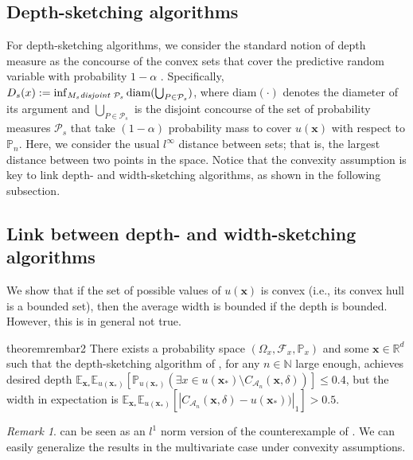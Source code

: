 \documentclass{article} %
\theoremstyle{remark}
\newtheorem{remark}{Remark}[section]
\theoremstyle{definition}      %
\begin{document}
\subsection{Depth-sketching algorithms}
For depth-sketching algorithms, we consider the standard notion of depth measure as the concourse of the convex sets that cover the predictive random variable with probability $1 - \alpha$ \citep[see, e.g.,][]{lei2018distributionfree,barber2021limits,bates2021distributionfree}. Specifically, $D_s(x):= \inf_{M_s \text{\normalfont{\emph{disjoint}} }  \mathcal{P}_s} \mathrm{diam}(\bigcup_{P \in  \mathcal{P}_s})$, where $\mathrm{diam}(\cdot)$ denotes the diameter of its argument and $\bigcup_{P \in  \mathcal{P}_s}$ is the disjoint concourse of the set of probability measures $\mathcal{P}_s$  that take $(1 - \alpha)$ probability mass to cover $u(\bm{x})$ with respect to $\mathbb{P}_n$. Here, we consider the usual $l^{\infty}$ distance between sets; that is, the largest distance between two points in the space. Notice that the convexity assumption is key to link depth- and width-sketching algorithms, as shown in the following subsection. 

\subsection{Link between depth- and width-sketching algorithms}
We show that if the set of possible values of $u(\bm{x})$ is convex (i.e., its convex hull is a bounded set), then the average width is bounded if the depth is bounded. However, this is in general not true.
\begin{restatable}{theorem}{rembar2}\label{prop:rem2}
There exists a probability space $(\Omega_x, \mathcal{F}_x,\mathbb{P}_x)$ and some $\bm{x} \in \mathbb{R}^d$ such that the depth-sketching algorithm of \cite{angelopoulos2024conformal}, for any $n \in \mathbb{N}$ large enough, achieves desired depth $\mathbb{E}_{\bm{x}_*} \mathbb{E}_{u(\bm{x_*})}[\mathbb{P}_{u(\bm{x_*})}(\exists x \in u(\bm{x_*}) \setminus C_{\mathcal{A}_n}(\bm{x},\delta))] \leq 0.4$, but the width in expectation is $\mathbb{E}_{\bm{x}_*} \mathbb{E}_{u(\bm{x_*})}[|C_{\mathcal{A}_n}(\bm{x},\delta) - u(\bm{x_*}))|_1] > 0.5$.
\end{restatable}
\begin{remark}
     can be seen as an $l^1$ norm version of the counterexample of \cite{angelopoulos2024conformal}. We can easily generalize the results in the multivariate case under convexity assumptions.
\end{remark}
\end{document}
